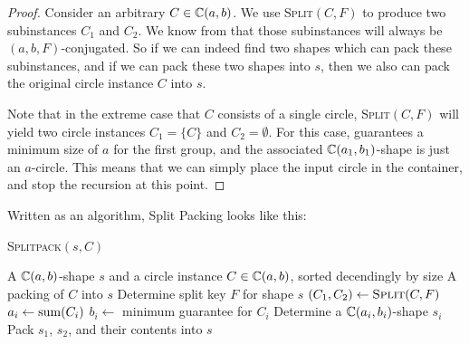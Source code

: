 \documentclass[a4paper,style=print,bibliography=totoc,nexus,lnum,extramargin]{tubsbook}
\begin{document}
\begin{proof}
    Consider an arbitrary $C \in \mathbb{C}(a,b)$.
    We use \textsc{Split}$(C,F)$ to produce two subinstances $C_1$ and $C_2$. We know from  that those subinstances will always be $(a,b,F)$-conjugated. So if we can indeed find two shapes which can pack these subinstances, and if we can pack these two shapes into $s$, then we also can pack the original circle instance $C$ into $s$.

Note that in the extreme case that $C$ consists of a single circle, \textsc{Split}$(C,F)$ will yield two circle instances $C_1 = \{C\}$ and $C_2 = \emptyset$. For this case,  guarantees a minimum size of $a$ for the first group, and the associated $\mathbb{C}(a_1,b_1)$-shape is just an $a$-circle. This means that we can simply place the input circle in the container, and stop the recursion at this point.
\end{proof}



Written as an algorithm, Split Packing looks like this:

\begin{algorithm}
    \caption{\textsc{Splitpack}$(s,C)$}
    \begin{algorithmic}
        \Require A $\mathbb{C}(a,b)$-shape $s$ and a circle instance $C \in \mathbb{C}(a,b)$, sorted decendingly by size
        \Ensure A packing of $C$ into $s$
        \State Determine split key $F$ for shape $s$
        \State $(C_1, C_2) \gets \textsc{Split}(C,F)$ 
            \State $a_i \gets \operatorname{sum}(C_i)$
            \State $b_i \gets$ minimum guarantee for $C_i$ 
            \State Determine a $\mathbb{C}(a_i, b_i)$-shape $s_i$
            \State {}
        \EndFor
        \State Pack $s_1$, $s_2$, and their contents into $s$
    \end{algorithmic}
\end{algorithm}
\end{document}
